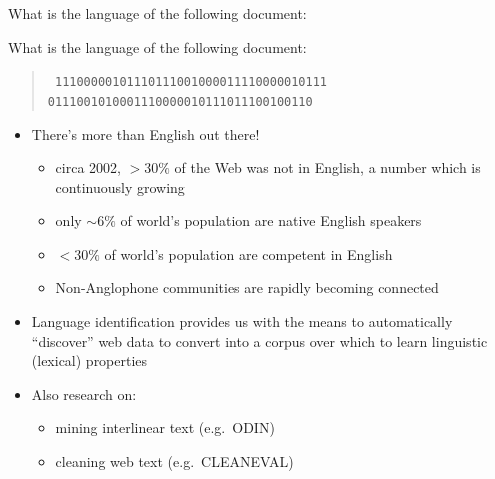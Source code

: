 \documentclass[a4paper,landscape,headrule,footrule,xetex]{foils}
\begin{document}

What is the language of the following document: \\[24pt]
 





What is the language of the following document:

\begin{minipage}[t]{1.0\linewidth}
\begin{quote}
\tt
11100000101110111001000011110000010111
0111001010001110000010111011100100110
\end{quote}
\end{minipage}








\MyLogo{}
\begin{itemize}
\item There's more than English out there!
\begin{itemize}
\item circa 2002, $>30\%$ of the Web was not in English, a number which
  is continuously growing
\item only $\sim 6\%$ of world's population are native English speakers
\item $<30\%$ of world's population are competent in English
\item Non-Anglophone communities are rapidly becoming connected
\end{itemize}
\end{itemize}





\begin{itemize}
\item Language identification provides us with the means to
  automatically ``discover'' web data to convert into a corpus over
  which to learn linguistic (lexical) properties
\item Also research on:
  \begin{itemize}
  \item mining interlinear text (e.g.\ ODIN)
  \item cleaning web text (e.g.\ CLEANEVAL)
  \end{itemize}

\end{itemize}
\end{document}
